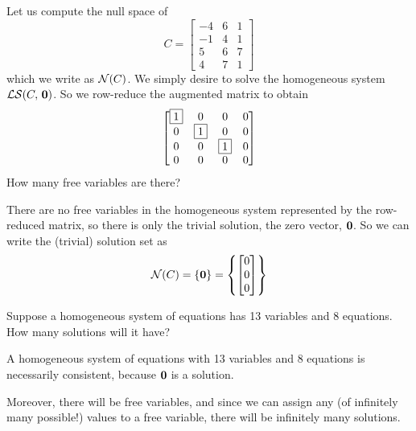 \documentclass{ximera}
\begin{document}
\begin{example}
  Let us compute the null space of
  \[
    C=\begin{bmatrix}
      -4 & 6 & 1 \\
      -1 & 4 & 1 \\
      5 & 6 & 7 \\
      4 & 7 & 1
    \end{bmatrix}
  \]
  which we write as $\mathcal{N}\!\left(C\right)$.   We simply desire to solve the homogeneous system $\mathcal{LS}\!\left(C,\,\mathbf{0}\right)$.  So we row-reduce the augmented matrix to obtain
  \[
    \begin{bmatrix}
      \fbox{1} & 0 & 0 & 0 \\
      0 & \fbox{1} & 0 & 0 \\
      0 & 0 & \fbox{1} & 0 \\
      0 & 0 & 0 & 0
    \end{bmatrix}
  \]
  How many free variables are there?
  \begin{multipleChoice}
  \end{multipleChoice}
  
  \begin{feedback}[correct]
    There are no free variables in the homogeneous system represented
    by the row-reduced matrix, so there is only the trivial solution,
    the zero vector, $\mathbf{0}$.  So we can write the (trivial)
    solution set as
    \[
      \mathcal{N}\!\left(C\right)=\left\{\mathbf{0}\right\}=\left\{\begin{bmatrix}0\\0\\0\end{bmatrix}\right\}
    \]
  \end{feedback}
\end{example}

\begin{question}
  Suppose a homogeneous system of equations has 13 variables and 8
  equations.  How many solutions will it have?

  \begin{multipleChoice}
  \end{multipleChoice}

  \begin{hint}
    A homogeneous system of equations with 13 variables and 8
    equations is necessarily consistent, because $\mathbf{0}$ is a
    solution.
  \end{hint}

  \begin{hint}
    Moreover, there will be free variables, and since we can assign
    any (of infinitely many possible!) values to a free variable,
    there will be infinitely many solutions.
  \end{hint}
\end{question}
\end{document}
